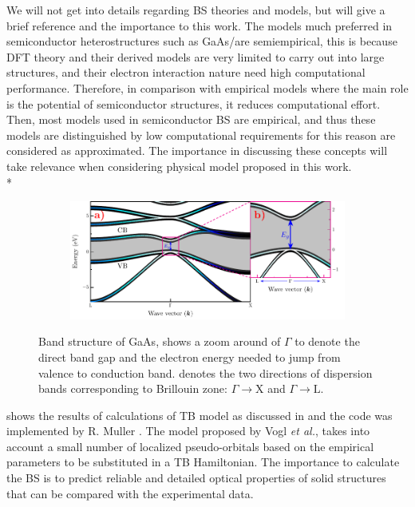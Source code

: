 We will not get into details regarding BS theories and models, but will give a brief reference and the importance to this work. The models much preferred in semiconductor heterostructures such as GaAs/\algaas are semiempirical, this is because
\gls{DFT} theory and their derived models are very limited to carry out into large structures, and
their electron interaction nature need high computational performance. Therefore, in comparison
with empirical models where the main role is the potential of semiconductor structures, it reduces computational effort.
Then, most models used in semiconductor BS are empirical, and thus these models are distinguished by low computational requirements for this reason are considered as approximated. The importance in discussing these concepts will take relevance when considering physical model proposed in this work. \\*
\begin{figure}[h!]\label{fig:subsubsection-1.1.1-GaAsbands-1}
	\centering
	\begin{subfigure}{\textwidth}
	\includegraphics[width=\linewidth]{../figures/chapter-1/bands/build/bands01}
	\label{subfig:subsubsection-1.1.1-GaAsbands-1-a)}
	\label{subfig:subsubsection-1.1.1-GaAsbands-1-b)}
\end{subfigure}
	\caption{Band structure of GaAs,  shows a zoom around of $\Gamma$  to denote the direct band gap and the electron energy needed to jump from valence to conduction band.  denotes the two directions of dispersion bands corresponding to Brillouin zone: $\Gamma\to\mathrm{X}$ and  $\Gamma\to\mathrm{L}$.\cite{fox2002optical}}
\end{figure}
 shows the results of calculations of \gls{TB} model as discussed in \cite{vogl1983asemiempirical} and the code was implemented by R. Muller \cite{rpmuller2017}. The model proposed by Vogl \textit{et al.},  takes into account a small number of localized pseudo-orbitals  based on the empirical parameters to be  substituted in a \gls{TB} Hamiltonian.  The importance to calculate the BS is to  predict  reliable and detailed optical properties of solid structures that can be compared with the experimental data.

